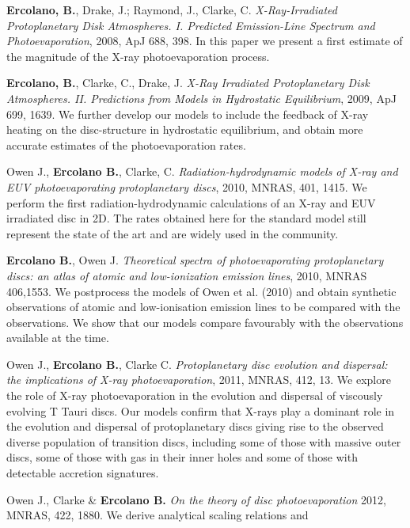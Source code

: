 \documentclass[10pt,fleqn,twoside]{article}
\begin{document}
\begin{literature}
\item \textbf{Ercolano, B.},  Drake, J.; Raymond, J., Clarke, C.
  \textit{X-Ray-Irradiated Protoplanetary Disk Atmospheres. I. Predicted Emission-Line Spectrum and Photoevaporation}, 2008, ApJ
  688, 398. In this paper we present a first estimate of the magnitude
  of the X-ray photoevaporation process. 
\item \textbf{Ercolano, B.}, Clarke, C., Drake, J. \textit{X-Ray
    Irradiated Protoplanetary Disk Atmospheres. II. Predictions from
    Models in Hydrostatic Equilibrium}, 2009, ApJ 699, 1639. We
  further develop our models to include the feedback of X-ray heating
  on the disc-structure in hydrostatic equilibrium, and obtain more
  accurate estimates of the photoevaporation rates. 
\item Owen J., \textbf{Ercolano B.}, Clarke,
  C. \textit{Radiation-hydrodynamic models of X-ray and EUV
    photoevaporating protoplanetary discs}, 2010, MNRAS, 
  401, 1415. We perform the first radiation-hydrodynamic calculations
  of an X-ray and EUV irradiated disc in 2D. The rates obtained here
  for the standard model still represent the state of the art and are
  widely used in the community. 
\item \textbf{Ercolano B.}, Owen J. {\em Theoretical spectra of
    photoevaporating protoplanetary discs: an atlas of atomic and
    low-ionization emission lines}, 2010, MNRAS 406,1553. We postprocess the
  models of Owen et al. (2010) and obtain synthetic observations of
  atomic and low-ionisation emission lines to be compared with the
  observations. We show that our models compare favourably with the
  observations available at the time.
\item Owen J., \textbf{Ercolano B.}, Clarke C.  \textit{
  Protoplanetary disc evolution and dispersal: the implications of X-ray photoevaporation}, 2011, MNRAS, 412, 13.
  We explore the role of X-ray photoevaporation in the evolution and
  dispersal of viscously evolving T Tauri discs. Our models confirm
  that X-rays play a dominant role in the evolution and dispersal of
  protoplanetary discs giving rise to the observed diverse population
  of transition discs, including some of those with massive outer
  discs, some of those
  with gas in their inner holes and some of those with detectable accretion
  signatures.  
\item Owen J., Clarke \& \textbf{Ercolano B.}  \textit{On the theory of disc photoevaporation}
  2012, MNRAS, 422, 1880. We derive analytical scaling relations and

\end{literature}
\end{document}
